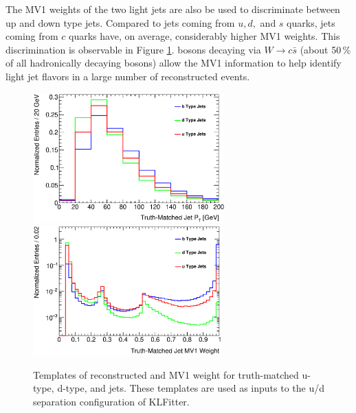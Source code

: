 The MV1 weights of the two light jets are also be used to discriminate between up and down type jets. Compared to jets coming from $u,d,$ and $s$ quarks, jets coming from $c$ quarks have, on average, considerably higher MV1 weights. This discrimination is observable in Figure \ref{fig:udSeparation_templates}. \Wboson bosons decaying via $W\rightarrow c\bar{s}$ (about 50\,\% of all hadronically decaying \Wboson bosons) allow the MV1 information to help identify light jet flavors in a large number of reconstructed events. 

\begin{figure}[!ht]
    \includegraphics[height=50mm]{chapters/whel/figures/pt_template_5jetOPT}
    \includegraphics[height=50mm]{chapters/whel/figures/mv1_template_5jetOPT}
    \caption{Templates of reconstructed \pt and MV1 weight for truth-matched u-type, d-type, and \bt jets. These templates are used as inputs to the u/d separation configuration of KLFitter.}
    \label{fig:udSeparation_templates}
\end{figure}

